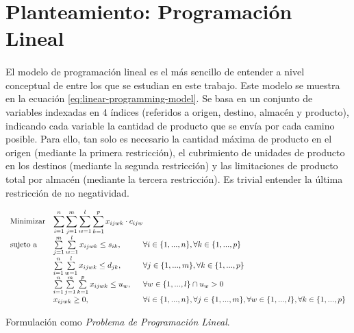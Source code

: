 \documentclass[a4paper, spanish]{article}
\begin{document}
  \section{Planteamiento: Programación Lineal}
  \label{section:linear-programming}

    \paragraph{}
    El modelo de programación lineal es el más sencillo de entender a nivel conceptual de entre los que se estudian en este trabajo. Este modelo se muestra en la ecuación \eqref{eq:linear-programming-model}. Se basa en un conjunto de variables indexadas en 4 índices (referidos a origen, destino, almacén y producto), indicando cada variable la cantidad de producto que se envía por cada camino posible. Para ello, tan solo es necesario la cantidad máxima de producto en el origen (mediante la primera restricción), el cubrimiento de unidades de producto en los destinos (mediante la segunda restricción) y las limitaciones de producto total por almacén (mediante la tercera restricción). Es trivial entender la última restricción de no negatividad.

    \begin{eqfloat}
      \begin{equation}
        \begin{array}{ll@{}ll}
          \text{Minimizar}	& \displaystyle \sum\limits_{i=1}^{n}\sum\limits_{j=1}^{m}\sum\limits_{w=1}^{l}\sum\limits_{k=1}^{p} x_{ijwk} \cdot c_{ijw} \\
          \text{sujeto a}		& \sum\limits_{j=1}^{m}\sum\limits_{w=1}^{l} x_{ijwk}	\leq s_{ik}, 		& \forall i \in \{1,...,n\}, \forall k \in \{1,...,p\}\\
                            &	\sum\limits_{i=1}^{n}\sum\limits_{w=1}^{l} x_{ijwk}	\leq d_{jk}, 		& \forall j \in \{1,...,m\}, \forall k \in \{1,...,p\}\\
                            &	\sum\limits_{i=1}^{n}\sum\limits_{j=1}^{m}\sum\limits_{k=1}^{p} x_{ijwk}	\leq u_{w}, 		& \forall w \in \{1,...,l\}  \cap u_{w} > 0 \\
                            & x_{ijwk}	\geq 0, 	& \forall i \in \{1,...,n\}, \forall j \in \{1,...,m\}, \forall w \in \{1,...,l\}, \forall k \in \{1,...,p\}
        \end{array}
      \end{equation}
      \caption{Formulación como \emph{Problema de Programación Lineal}.}
      \label{eq:linear-programming-model}
    \end{eqfloat}
\end{document}
